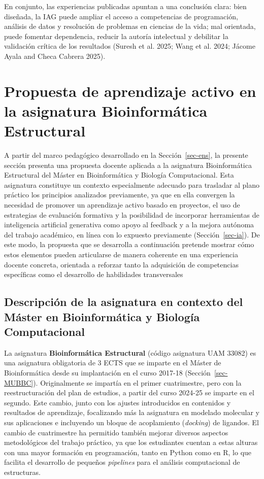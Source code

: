 \documentclass[
  11pt,
  a4paper,
  twoside]{scrreprt}
\begin{document}
En conjunto, las experiencias publicadas apuntan a una conclusión clara:
bien diseñada, la IAG puede ampliar el acceso a competencias de
programación, análisis de datos y resolución de problemas en ciencias de
la vida; mal orientada, puede fomentar dependencia, reducir la autoría
intelectual y debilitar la validación crítica de los resultados (Suresh
et al. 2025; Wang et al. 2024; Jácome Ayala and Checa Cabrera 2025).

\section{Propuesta de aprendizaje activo en la asignatura Bioinformática
Estructural}\label{sec-42}

A partir del marco pedagógico desarrollado en la Sección~\ref{sec-ens},
la presente sección presenta una propuesta docente aplicada a la
asignatura Bioinformática Estructural del Máster en Bioinformática y
Biología Computacional. Esta asignatura constituye un contexto
especialmente adecuado para trasladar al plano práctico los principios
analizados previamente, ya que en ella convergen la necesidad de
promover un aprendizaje activo basado en proyectos, el uso de
estrategias de evaluación formativa y la posibilidad de incorporar
herramientas de inteligencia artificial generativa como apoyo al
feedback y a la mejora autónoma del trabajo académico, en línea con lo
expuesto previamente (Sección~\ref{sec-ia}). De este modo, la propuesta
que se desarrolla a continuación pretende mostrar cómo estos elementos
pueden articularse de manera coherente en una experiencia docente
concreta, orientada a reforzar tanto la adquisición de competencias
específicas como el desarrollo de habilidades transversales

\subsection{Descripción de la asignatura en contexto del Máster en
Bioinformática y Biología
Computacional}\label{descripciuxf3n-de-la-asignatura-en-contexto-del-muxe1ster-en-bioinformuxe1tica-y-biologuxeda-computacional}

La asignatura \textbf{Bioinformática Estructural} (código asignatura UAM
33082) es una asignatura obligatoria de 3 ECTS que se imparte en el
Máster de Bioinformática desde su implantación en el curso 2017-18
(Sección~\ref{sec-MUBBC}). Originalmente se impartía en el primer
cuatrimestre, pero con la reestructuración del plan de estudios, a
partir del curso 2024-25 se imparte en el segundo. Este cambio, junto
con los ajustes introducidos en contenidos y resultados de aprendizaje,
focalizando más la asignatura en modelado molecular y sus aplicaciones e
incluyendo un bloque de acoplamiento (\emph{docking}) de ligandos. El
cambio de cuatrimestre ha permitido también mejorar diversos aspectos
metodológicos del trabajo práctico, ya que los estudiantes cuentan a
estas alturas con una mayor formación en programación, tanto en Python
como en R, lo que facilita el desarrollo de pequeños \emph{pipelines}
para el análisis computacional de estructuras.
\end{document}
